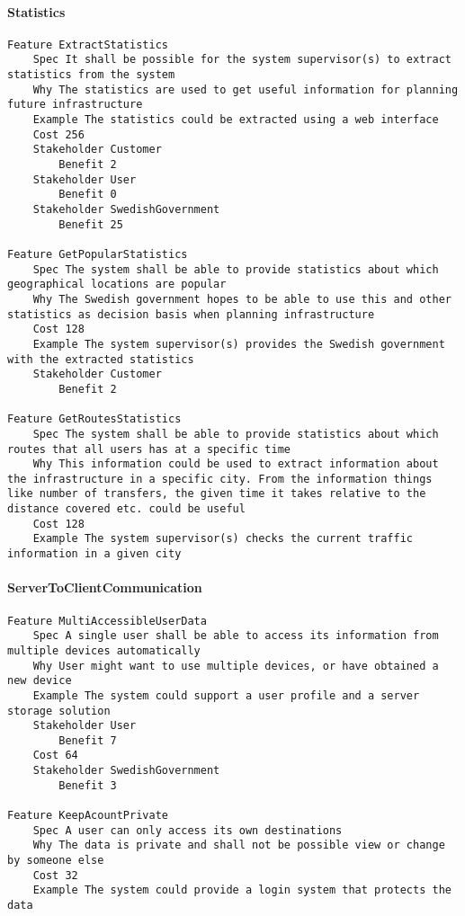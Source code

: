 \begin{lstlisting}

\end{lstlisting}


			 \paragraph{Statistics}


\begin{lstlisting}
Feature ExtractStatistics
	Spec It shall be possible for the system supervisor(s) to extract statistics from the system
	Why The statistics are used to get useful information for planning future infrastructure
	Example The statistics could be extracted using a web interface
	Cost 256
	Stakeholder Customer
		Benefit 2
	Stakeholder User
		Benefit 0
	Stakeholder SwedishGovernment
		Benefit 25

Feature GetPopularStatistics
	Spec The system shall be able to provide statistics about which geographical locations are popular
	Why The Swedish government hopes to be able to use this and other statistics as decision basis when planning infrastructure
	Cost 128
	Example The system supervisor(s) provides the Swedish government with the extracted statistics
	Stakeholder Customer
		Benefit 2

Feature GetRoutesStatistics
	Spec The system shall be able to provide statistics about which routes that all users has at a specific time
	Why This information could be used to extract information about the infrastructure in a specific city. From the information things like number of transfers, the given time it takes relative to the distance covered etc. could be useful
	Cost 128
	Example The system supervisor(s) checks the current traffic information in a given city

\end{lstlisting}
		
				
			 \paragraph{ServerToClientCommunication}


\begin{lstlisting}
Feature MultiAccessibleUserData
	Spec A single user shall be able to access its information from multiple devices automatically
	Why User might want to use multiple devices, or have obtained a new device
	Example The system could support a user profile and a server storage solution
	Stakeholder User
		Benefit 7
	Cost 64
	Stakeholder SwedishGovernment
		Benefit 3

Feature KeepAcountPrivate
	Spec A user can only access its own destinations
	Why The data is private and shall not be possible view or change by someone else
	Cost 32
	Example The system could provide a login system that protects the data

\end{lstlisting}
		
